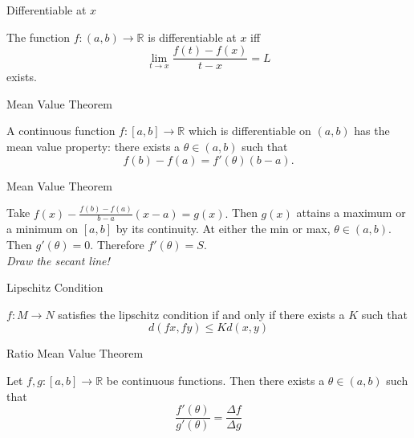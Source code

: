 \begin{flashcard}[Definition]{Differentiable at $x$}

    The function $f: (a,b) \to \mathbb{R}$ is differentiable at $x$ iff
    $$\lim_{t\to x} \frac{f(t) - f(x)}{t -x} = L$$
    exists.

\end{flashcard}

\begin{flashcard}[Theorem]{Mean Value Theorem}

    A continuous function $f:[a,b] \to \mathbb{R}$ which is differentiable on $(a,b)$ has the mean value property:
    there exists a $\theta \in (a,b)$ such that $$f(b) -f(a) = f'(\theta)(b-a).$$

\end{flashcard}


\begin{flashcard}[Proof]{Mean Value Theorem}

    Take $f(x) - \frac{f(b) - f(a)}{b-a}(x-a) = g(x).$ Then $g(x)$ attains a maximum or a minimum on $[a,b]$ by its continuity. 
    At either the min or max, $\theta \in (a,b).$ Then $g'(\theta) = 0.$ Therefore $f'(\theta) = S$. \\
    \emph{Draw the secant line!}

\end{flashcard}

\begin{flashcard}[Definition]{Lipschitz Condition}

    $f : M \to N$ satisfies the lipschitz condition if and only if there exists a $K$ such that
    $$d(fx,fy) \leq Kd(x,y)$$

\end{flashcard}

\begin{flashcard}[Theorem]{Ratio Mean Value Theorem}

    Let $f,g : [a,b] \to \mathbb{R}$ be continuous functions. Then there exists a $\theta \in (a,b)$ such that 
    $$\frac{f'(\theta)}{g'(\theta)} = \frac{\Delta f}{\Delta g}$$

\end{flashcard}


